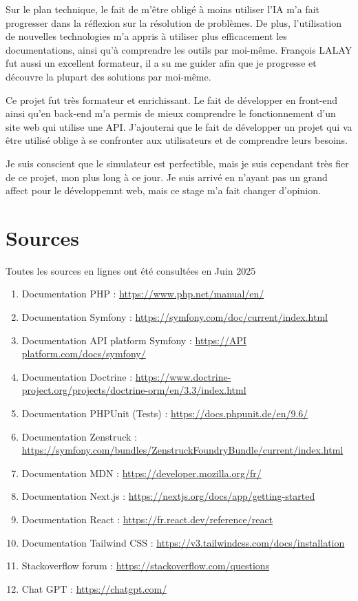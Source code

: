 \documentclass[a4paper,12pt]{report}
\begin{document}
\vspace{1em}

Sur le plan technique, le fait de m'être obligé à moins utiliser l'IA m'a fait progresser dans la réflexion sur la résolution de problèmes. De plus, l'utilisation de nouvelles technologies m'a appris à utiliser plus efficacement les documentations, ainsi qu'à comprendre les outils par moi-même. François LALAY fut aussi un excellent formateur, il a su me guider afin que je progresse et découvre la plupart des solutions par moi-même.

\vspace{1em}

Ce projet fut très formateur et enrichissant. Le fait de développer en front-end ainsi qu'en back-end m'a permis de mieux comprendre le fonctionnement d'un site web qui utilise une API. J'ajouterai que le fait de développer un projet qui va être utilisé oblige à se confronter aux utilisateurs et de comprendre leurs besoins.

\vspace{1em}

Je suis conscient que le simulateur est perfectible, mais je suis cependant très fier de ce projet, mon plus long à ce jour. Je suis arrivé en n'ayant pas un grand affect pour le développemnt web, mais ce stage m'a fait changer d'opinion.

\chapter{Sources}
Toutes les sources en lignes ont été consultées en Juin 2025

\begin{enumerate}
    \item Documentation PHP : \url{https://www.php.net/manual/en/}
    \item Documentation Symfony : \url{https://symfony.com/doc/current/index.html}
    \item Documentation API platform Symfony : \url{https://API platform.com/docs/symfony/}
    \item Documentation Doctrine : \url{https://www.doctrine-project.org/projects/doctrine-orm/en/3.3/index.html}
    \item Documentation PHPUnit (Tests) : \url{https://docs.phpunit.de/en/9.6/}
    \item Documentation Zenstruck : \url{https://symfony.com/bundles/ZenstruckFoundryBundle/current/index.html}
    \item Documentation MDN : \url{https://developer.mozilla.org/fr/}
    \item Documentation Next.js : \url{https://nextjs.org/docs/app/getting-started}
    \item Documentation React : \url{https://fr.react.dev/reference/react}
    \item Documentation Tailwind CSS : \url{https://v3.tailwindcss.com/docs/installation}
    \item Stackoverflow forum : \url{https://stackoverflow.com/questions}
    \item Chat GPT : \url{https://chatgpt.com/}
\end{enumerate}
\end{document}
